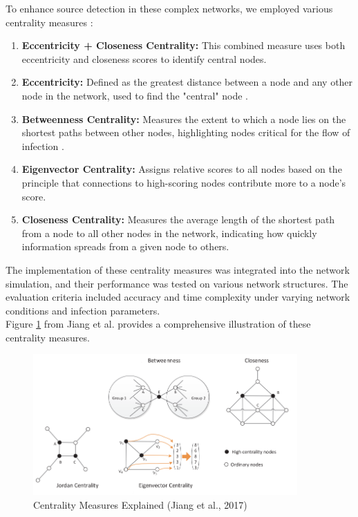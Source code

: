 To enhance source detection in these complex networks, we employed various centrality measures \cite{jiang2017}:
\label{centrality_measure}
\begin{enumerate}
    \item \textbf{Eccentricity + Closeness Centrality:} This combined measure uses both eccentricity and closeness scores to identify central nodes. 
    \item \textbf{Eccentricity:} Defined as the greatest distance between a node and any other node in the network, used to find the "central" node \cite{newman2010}.
    \item \textbf{Betweenness Centrality:} Measures the extent to which a node lies on the shortest paths between other nodes, highlighting nodes critical for the flow of infection \cite{girvan2002}.
    \item \textbf{Eigenvector Centrality:} Assigns relative scores to all nodes based on the principle that connections to high-scoring nodes contribute more to a node's score.
    \item \textbf{Closeness Centrality:} Measures the average length of the shortest path from a node to all other nodes in the network, indicating how quickly information spreads from a given node to others.
\end{enumerate}

The implementation of these centrality measures was integrated into the network simulation, and their performance was tested on various network structures. The evaluation criteria included accuracy and time complexity under varying network conditions and infection parameters.\\

Figure \ref{fig:centrality_measures_explained} from Jiang et al. \cite{jiang2017} provides a comprehensive illustration of these centrality measures.

\begin{figure}[H]
    \centering
    \includegraphics[width=0.9\textwidth]{img/centrality_measures.png}
    \caption{Centrality Measures Explained (Jiang et al., 2017)}
    \label{fig:centrality_measures_explained}
\end{figure}


